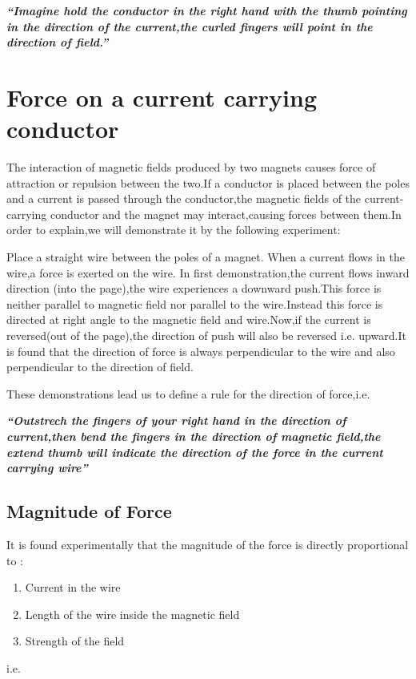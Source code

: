 \textit{\textbf{“Imagine hold the conductor in the right hand with the thumb pointing in the direction of the current,the curled fingers will point in the direction of field.”}}

\section{Force on a current carrying conductor}
The interaction of magnetic fields produced by two magnets causes force of attraction or repulsion between the two.If a conductor is placed between the poles and a current is passed through the conductor,the magnetic fields of the current-carrying conductor and the magnet may interact,causing forces between them.In order to explain,we will demonstrate it by the following experiment:

Place a straight wire between the poles of a magnet.
When a current flows in the wire,a force is exerted on the wire.
In first demonstration,the current flows inward direction (into the page),the wire experiences a downward push.This force is neither parallel to magnetic field nor parallel to the wire.Instead this force is directed at right angle to the magnetic field and wire.Now,if the current is reversed(out of the page),the direction of push will also be reversed i.e. upward.It is found that the direction of force is
always perpendicular to the wire and also perpendicular to the direction of field.





These demonstrations lead us to define a rule for the direction of force,i.e.

\textit{\textbf{“Outstrech the fingers of your right hand in the direction of current,then bend the fingers in the direction of magnetic field,the extend thumb will indicate the direction of the force in the current carrying wire”}}


\subsection{Magnitude of Force}
 It is found experimentally that the magnitude of the force is directly proportional to :
 
 \begin{enumerate}[label = (\roman*)]
    \item Current in the wire
    \item Length of the wire inside the magnetic field
    \item Strength of the field
\end{enumerate}
i.e.

